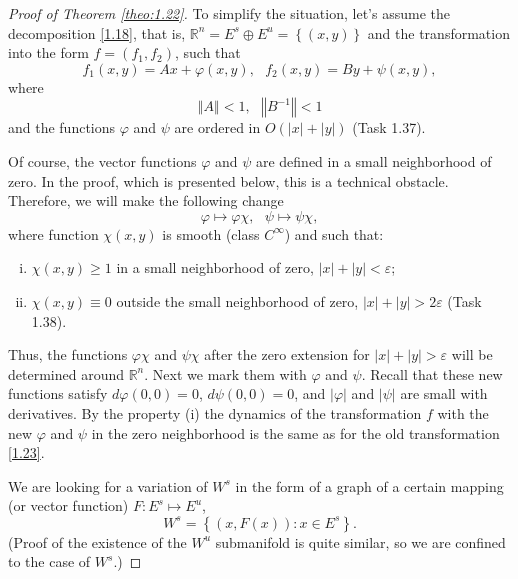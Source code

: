 \begin{proof}[Proof of Theorem \ref{theo:1.22}]
	To simplify the situation, let's assume the decomposition \eqref{1.18}, that is, $\mathbb{R}^{n}=E^{s}\oplus
	E^{u}=\left\{ \left( x,y\right) \right\} $ and the transformation into the form $f=\left( f_{1},f_{2}\right) $, such that
	\begin{equation}
	\label{1.23}
	f_{1}(x,y)=Ax+\varphi (x,y),\text{ \ \ }f_{2}(x,y)=By+\psi (x,y),
	\end{equation}
	where
	\begin{equation}
	\label{1.24}
	\left\Vert A\right\Vert <1,\text{ \ \ \ }\left\Vert B^{-1}\right\Vert <1
	\end{equation}
	and the functions $\varphi $ and $\psi $ are ordered in $O(\left\vert
	x\right\vert +\left\vert y\right\vert )$ (Task 1.37).
	
	Of course, the vector functions $\varphi $ and $\psi $ are defined in a small neighborhood of zero. In the proof, which is presented below, this is a technical obstacle. Therefore, we will make the following change $$
	\varphi \longmapsto \varphi \chi ,\text{ \ \ }\psi \longmapsto \psi \chi ,
	$$ where function $\chi (x,y)$ is smooth (class $C^{\infty }$) and such that:
	\begin{enumerate}[(i)]
		\item $\chi (x,y)\geq 1$ in a small neighborhood of zero, $\left\vert
		x\right\vert +\left\vert y\right\vert <\varepsilon $;
		\item $\chi (x,y)\equiv 0$ outside the small neighborhood of zero, $\left\vert
		x\right\vert +\left\vert y\right\vert >2\varepsilon $ (Task 1.38).
	\end{enumerate}
	Thus, the functions $\varphi \chi $ and $\psi \chi $ after the zero extension for $\left\vert x\right\vert +\left\vert y\right\vert >\varepsilon $ will be determined around $\mathbb{R}^{n}$. Next we mark them with $\varphi $ and $\psi $. Recall that these new functions satisfy $d\varphi (0,0)=0$, $d\psi (0,0)=0$, and $\left\vert \varphi \right\vert $ and $\left\vert \psi \right\vert $ are small with derivatives. By the property (i) the dynamics of the transformation $f$ with the new $\varphi $ and $\psi $ in the zero neighborhood is the same as for the old transformation \eqref{1.23}.
	
	We are looking for a variation of $W^s$ in the form of a graph of a certain mapping (or vector function) $F:E^{s}\longmapsto E^{u}$,
	$$
	W^{s}=\left\{ (x,F(x)):x\in E^{s}\right\} .
	$$
	(Proof of the existence of the $W^{u}$ submanifold is quite similar, so we are confined to the case of $W^{s}$.)
	

\end{proof}
